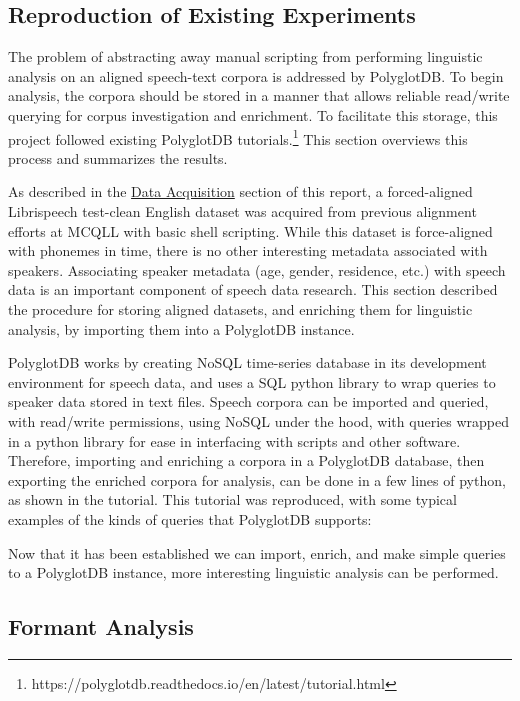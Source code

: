 \documentclass[11pt]{article}
\begin{document}
\subsection{Reproduction of Existing Experiments}

The problem of abstracting away manual scripting from performing linguistic analysis on an aligned speech-text corpora is addressed by PolyglotDB. To begin analysis, the corpora should be stored in a manner that allows reliable read/write querying for corpus investigation and enrichment. To facilitate this storage, this project followed existing PolyglotDB tutorials.\footnote{https://polyglotdb.readthedocs.io/en/latest/tutorial.html} This section overviews this process and summarizes the results.

As described in the \hyperlink{section.22}{Data Acquisition} section of this report, a forced-aligned Librispeech test-clean English dataset was acquired from previous alignment efforts at MCQLL with basic shell scripting. While this dataset is force-aligned with phonemes in time, there is no other interesting metadata associated with speakers. Associating speaker metadata (age, gender, residence, etc.) with speech data is an important component of speech data research. This section described the procedure for storing aligned datasets, and enriching them for linguistic analysis, by importing them into a PolyglotDB instance. 

PolyglotDB works by creating NoSQL time-series database in its development environment for speech data, and uses a SQL python library to wrap queries to speaker data stored in text files. Speech corpora can be imported and queried, with read/write permissions, using NoSQL under the hood, with queries wrapped in a python library for ease in interfacing with scripts and other software. Therefore, importing and enriching a corpora in a PolyglotDB database, then exporting the enriched corpora for analysis, can be done in a few lines of python, as shown in the tutorial. This tutorial was reproduced, with some typical examples of the kinds of queries that PolyglotDB supports:


Now that it has been established we can import, enrich, and make simple queries to a PolyglotDB instance, more interesting linguistic analysis can be performed.

\subsection{Formant Analysis}
\end{document}
